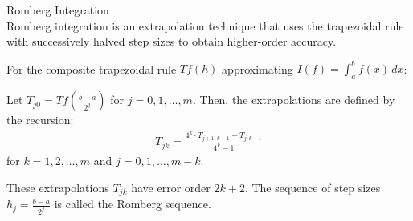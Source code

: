 \begin{definition}{Romberg Integration}\\
Romberg integration is an extrapolation technique that uses the trapezoidal rule with successively halved step sizes to obtain higher-order accuracy.

For the composite trapezoidal rule $Tf(h)$ approximating $I(f) = \int_a^b f(x) \, dx$:

Let $T_{j0} = Tf\left(\frac{b-a}{2^j}\right)$ for $j = 0, 1, \ldots, m$. Then, the extrapolations are defined by the recursion:
\begin{align*}
T_{jk} = \frac{4^k \cdot T_{j+1,k-1} - T_{j,k-1}}{4^k - 1}
\end{align*}
for $k = 1, 2, \ldots, m$ and $j = 0, 1, \ldots, m-k$.

These extrapolations $T_{jk}$ have error order $2k+2$. The sequence of step sizes $h_j = \frac{b-a}{2^j}$ is called the Romberg sequence.
\end{definition}

